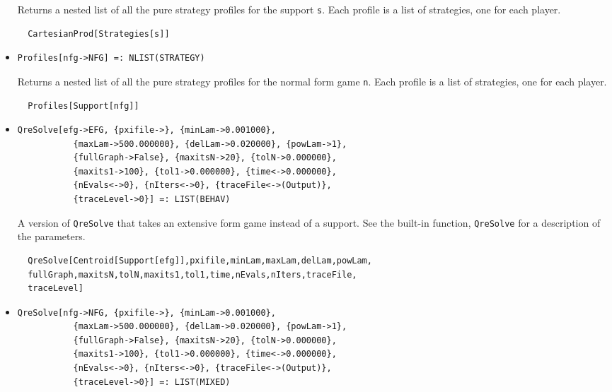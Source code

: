 \begin{itemize}
\bd 
Returns a nested list of all the pure strategy profiles for the support
\verb+s+.  Each profile is a list of strategies, one for each player.  
\begin{verbatim}
  CartesianProd[Strategies[s]]
\end{verbatim} 
\ed


\item{}
\protect \large \begin{verbatim}
Profiles[nfg->NFG] =: NLIST(STRATEGY) 
\end{verbatim}\normalsize

\bd 
Returns a nested list of all the pure strategy profiles for the normal
form game \verb+n+.  Each profile is a list of strategies, one for
each player.
\begin{verbatim}
  Profiles[Support[nfg]]
\end{verbatim} 
\ed


\item{}
\protect \large \begin{verbatim}
QreSolve[efg->EFG, {pxifile->}, {minLam->0.001000}, 
           {maxLam->500.000000}, {delLam->0.020000}, {powLam->1}, 
           {fullGraph->False}, {maxitsN->20}, {tolN->0.000000}, 
           {maxits1->100}, {tol1->0.000000}, {time<->0.000000}, 
           {nEvals<->0}, {nIters<->0}, {traceFile<->(Output)}, 
           {traceLevel->0}] =: LIST(BEHAV) 
\end{verbatim}\normalsize

\bd 
A version of \verb+QreSolve+ that takes an extensive form
game instead of a support.  See the built-in function,
\verb+QreSolve+ for a description of the parameters.
\begin{verbatim}
  QreSolve[Centroid[Support[efg]],pxifile,minLam,maxLam,delLam,powLam, 
  fullGraph,maxitsN,tolN,maxits1,tol1,time,nEvals,nIters,traceFile,
  traceLevel]
\end{verbatim} 
\ed

\item{}
\protect \large \begin{verbatim}
QreSolve[nfg->NFG, {pxifile->}, {minLam->0.001000}, 
           {maxLam->500.000000}, {delLam->0.020000}, {powLam->1}, 
           {fullGraph->False}, {maxitsN->20}, {tolN->0.000000}, 
           {maxits1->100}, {tol1->0.000000}, {time<->0.000000}, 
           {nEvals<->0}, {nIters<->0}, {traceFile<->(Output)}, 
           {traceLevel->0}] =: LIST(MIXED) 
\end{verbatim}\normalsize


\end{itemize}
